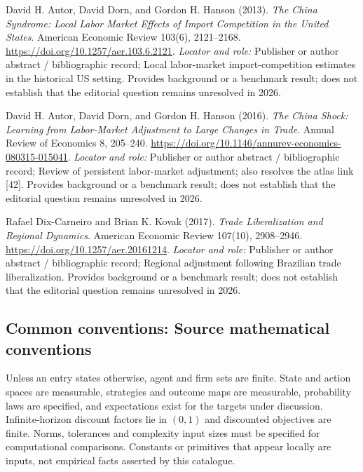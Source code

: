 \documentclass[11pt,a4paper]{article}
\begin{document}
\begin{enumerate}[label={[S\arabic*]},leftmargin=*]

\item David H. Autor, David Dorn, and Gordon H. Hanson (2013). \emph{The China Syndrome: Local Labor Market Effects of Import Competition in the United States}. American Economic Review 103(6), 2121–2168. \url{https://doi.org/10.1257/aer.103.6.2121}.
\textit{Locator and role:} Publisher or author abstract / bibliographic record; Local labor-market import-competition estimates in the historical US setting. Provides background or a benchmark result; does not establish that the editorial question remains unresolved in 2026.

\item David H. Autor, David Dorn, and Gordon H. Hanson (2016). \emph{The China Shock: Learning from Labor-Market Adjustment to Large Changes in Trade}. Annual Review of Economics 8, 205–240. \url{https://doi.org/10.1146/annurev-economics-080315-015041}.
\textit{Locator and role:} Publisher or author abstract / bibliographic record; Review of persistent labor-market adjustment; also resolves the atlas link [42]. Provides background or a benchmark result; does not establish that the editorial question remains unresolved in 2026.

\item Rafael Dix-Carneiro and Brian K. Kovak (2017). \emph{Trade Liberalization and Regional Dynamics}. American Economic Review 107(10), 2908–2946. \url{https://doi.org/10.1257/aer.20161214}.
\textit{Locator and role:} Publisher or author abstract / bibliographic record; Regional adjustment following Brazilian trade liberalization. Provides background or a benchmark result; does not establish that the editorial question remains unresolved in 2026.

\end{enumerate}

\subsection*{Common conventions: Source mathematical conventions}

Unless an entry states otherwise, agent and firm sets are finite. State and action spaces are measurable, strategies and outcome maps are measurable, probability laws are specified, and expectations exist for the targets under discussion. Infinite-horizon discount factors lie in $(0,1)$ and discounted objectives are finite. Norms, tolerances and complexity input sizes must be specified for computational comparisons. Constants or primitives that appear locally are inputs, not empirical facts asserted by this catalogue.
\end{document}
